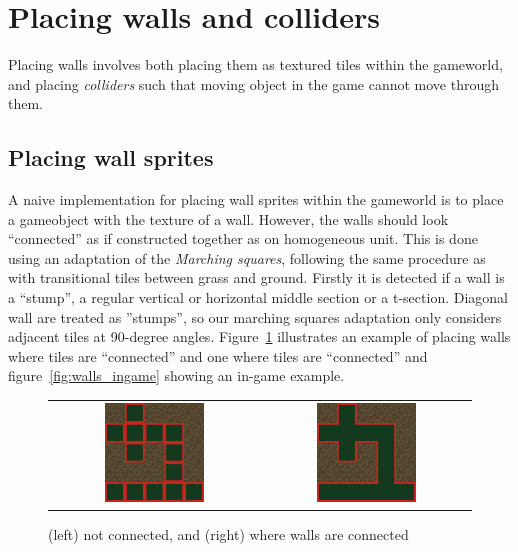 \section{Placing walls and colliders}
Placing walls involves both placing them as textured tiles within the gameworld, and placing \textit{colliders} such that moving object in the game cannot move through them.

\subsection{Placing wall sprites}
A naive implementation for placing wall sprites within the gameworld is to place
a gameobject with the texture of a wall. However, the walls should look
``connected'' as if constructed together as on homogeneous unit. This is done
using an adaptation of the \textit{Marching squares}, following the same procedure as with
transitional tiles between grass and ground. Firstly it is detected if a wall is a
``stump'', a regular vertical or horizontal middle section or a t-section. 
Diagonal wall are treated as ''stumps'', so our marching squares adaptation only
considers adjacent tiles at 90-degree angles. Figure~\ref{fig:wall_comparison}
illustrates an example of placing walls where tiles are ``connected'' and one where
tiles are ``connected'' and figure~\ref{fig:walls_ingame} showing an in-game
example.

\begin{figure}[H]
    \centering
    \begin{tabular}{cc}
        \includegraphics[width=0.5\textwidth]{figures/generating_levels/wall_no_border.png}
        &
        \includegraphics[width=0.5\textwidth]{figures/generating_levels/wall_with_border.png}
    \end{tabular}
    \caption{(left) not connected, and (right) where walls are connected}\label{fig:wall_comparison}
\end{figure}

